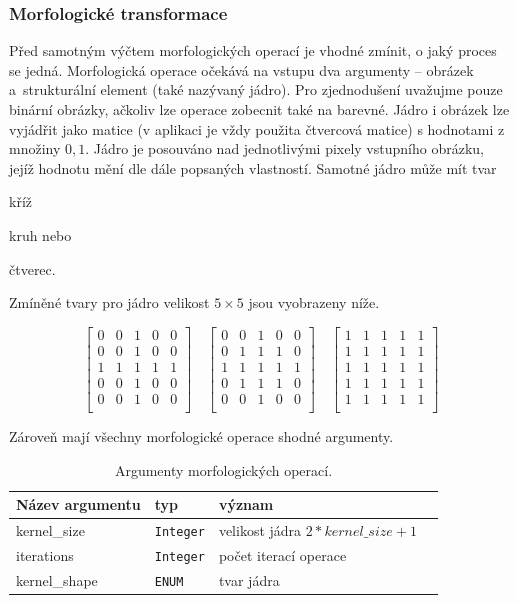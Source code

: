 \documentclass[
  field=ainfp,
  master=true,
  biblatex,
  sourcecodes=false,
  theorems=false,
  glossaries,
  index
]{kidiplom}
\begin{document}
\subsubsection*{Morfologické transformace}
Před samotným výčtem morfologických operací je vhodné zmínit, o jaký proces se jedná. Morfologická operace očekává na vstupu dva argumenty -- obrázek a~strukturální element (také nazývaný jádro). Pro zjednodušení uvažujme pouze binární obrázky, ačkoliv lze operace zobecnit také na barevné. Jádro i obrázek lze vyjádřit jako matice (v aplikaci je vždy použita čtvercová matice) s hodnotami z množiny $ {0, 1} $. Jádro je posouváno nad jednotlivými pixely vstupního obrázku, jejíž hodnotu mění dle dále popsaných vlastností. Samotné jádro může mít tvar 
\begin{enumerate*}[label={\alph*)}]
\item kříž
\item kruh nebo
\item čtverec.
\end{enumerate*}
Zmíněné tvary pro jádro velikost $5 \times 5$ jsou vyobrazeny níže.

$$
\begin{bmatrix} 
0 & 0 & 1 & 0 & 0 \\
0 & 0 & 1 & 0 & 0 \\
1 & 1 & 1 & 1 & 1 \\
0 & 0 & 1 & 0 & 0 \\
0 & 0 & 1 & 0 & 0 \\
\end{bmatrix}
\quad
\begin{bmatrix} 
0 & 0 & 1 & 0 & 0 \\
0 & 1 & 1 & 1 & 0 \\
1 & 1 & 1 & 1 & 1 \\
0 & 1 & 1 & 1 & 0 \\
0 & 0 & 1 & 0 & 0 \\
\end{bmatrix}
\quad
\begin{bmatrix} 
1 & 1 & 1 & 1 & 1 \\
1 & 1 & 1 & 1 & 1 \\
1 & 1 & 1 & 1 & 1 \\
1 & 1 & 1 & 1 & 1 \\
1 & 1 & 1 & 1 & 1 \\
\end{bmatrix}
$$

Zároveň mají všechny morfologické operace shodné argumenty.


\begin{table}[H]
\centering
\begin{tabular}{|l|l|l|l|}
\hline
\textbf{Název argumentu} & \textbf{typ} & \textbf{význam}
\\ \hline
kernel\_size & \texttt{Integer} & velikost jádra $2 * kernel\_size + 1$
\\ \hline
iterations & \texttt{Integer} & počet iterací operace
\\ \hline
kernel\_shape & \texttt{ENUM}  & tvar jádra
\\ \hline
\end{tabular}
\caption{Argumenty morfologických operací.}
\end{table}
\end{document}
